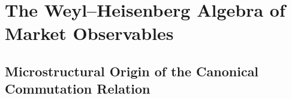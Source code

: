 
\section{The Weyl--Heisenberg Algebra of Market Observables}\label{sec:weyl-heisenberg}

\subsection{Microstructural Origin of the Canonical Commutation Relation}
\label{sec:ccr-derivation}

